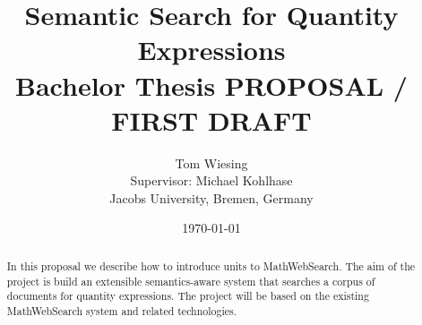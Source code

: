 \documentclass[11pt]{article}
\title{Semantic Search for Quantity Expressions\\ \vspace{2 mm} Bachelor Thesis PROPOSAL / FIRST DRAFT\ednote{Remove draft status}}
\author{Tom Wiesing\\Supervisor: Michael Kohlhase\\Jacobs University, Bremen, Germany}
\date{\today}
\begin{document}
\maketitle
{}

\begin{abstract}
  In this proposal we describe how to introduce units to MathWebSearch. The aim of the project is build an extensible semantics-aware system that searches a corpus of documents for quantity expressions. The project will be based on the existing MathWebSearch system and related technologies. 
\end{abstract}

\tableofcontents

\newpage



\newpage



\newpage



\newpage



\newpage



\newpage



\newpage



\newpage

{}
\end{document}
